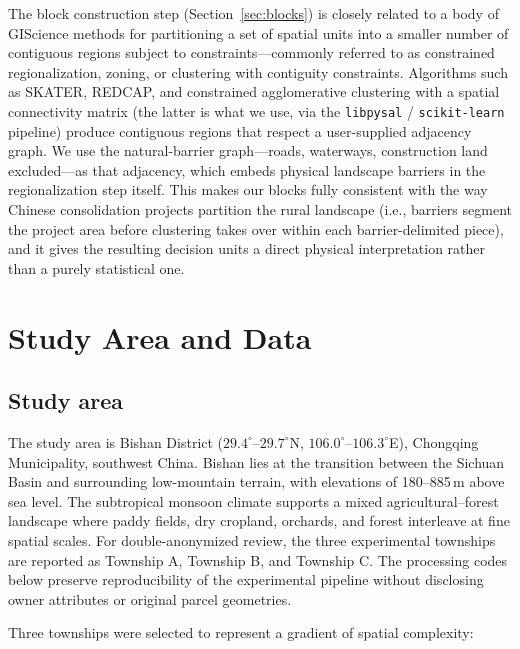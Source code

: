 \documentclass[preprint,12pt]{elsarticle}
\begin{document}
The block construction step (Section~\ref{sec:blocks}) is closely related to a body of GIScience methods for partitioning a set of spatial units into a smaller number of contiguous regions subject to constraints---commonly referred to as constrained regionalization, zoning, or clustering with contiguity constraints. Algorithms such as SKATER, REDCAP, and constrained agglomerative clustering with a spatial connectivity matrix (the latter is what we use, via the \texttt{libpysal} / \texttt{scikit-learn} pipeline) produce contiguous regions that respect a user-supplied adjacency graph. We use the natural-barrier graph---roads, waterways, construction land excluded---as that adjacency, which embeds physical landscape barriers in the regionalization step itself. This makes our blocks fully consistent with the way Chinese consolidation projects partition the rural landscape (i.e., barriers segment the project area before clustering takes over within each barrier-delimited piece), and it gives the resulting decision units a direct physical interpretation rather than a purely statistical one.


\section{Study Area and Data}
\label{sec:data}

\subsection{Study area}

The study area is Bishan District ($29.4^\circ$--$29.7^\circ$N, $106.0^\circ$--$106.3^\circ$E), Chongqing Municipality, southwest China. Bishan lies at the transition between the Sichuan Basin and surrounding low-mountain terrain, with elevations of 180--885\,m above sea level. The subtropical monsoon climate supports a mixed agricultural--forest landscape where paddy fields, dry cropland, orchards, and forest interleave at fine spatial scales. For double-anonymized review, the three experimental townships are reported as Township A, Township B, and Township C. The processing codes below preserve reproducibility of the experimental pipeline without disclosing owner attributes or original parcel geometries.

Three townships were selected to represent a gradient of spatial complexity:
\end{document}
